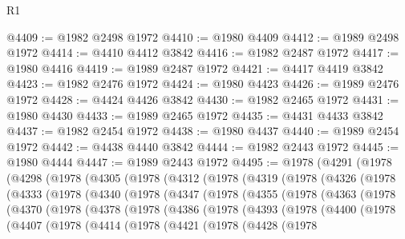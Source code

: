 \begin{lexlean}{R1}
\begin{coremodule}
@4409 := @1982 @2498 @1972
@4410 := @1980 @4409
@4412 := @1989 @2498 @1972
@4414 := @4410 @4412 @3842
@4416 := @1982 @2487 @1972
@4417 := @1980 @4416
@4419 := @1989 @2487 @1972
@4421 := @4417 @4419 @3842
@4423 := @1982 @2476 @1972
@4424 := @1980 @4423
@4426 := @1989 @2476 @1972
@4428 := @4424 @4426 @3842
@4430 := @1982 @2465 @1972
@4431 := @1980 @4430
@4433 := @1989 @2465 @1972
@4435 := @4431 @4433 @3842
@4437 := @1982 @2454 @1972
@4438 := @1980 @4437
@4440 := @1989 @2454 @1972
@4442 := @4438 @4440 @3842
@4444 := @1982 @2443 @1972
@4445 := @1980 @4444
@4447 := @1989 @2443 @1972
@4495 := @1978
    (@4291
      (@1978
        (@4298
          (@1978
            (@4305
              (@1978
                (@4312
                  (@1978
                    (@4319
                      (@1978
                        (@4326
                          (@1978
                            (@4333
                              (@1978
                                (@4340
                                  (@1978
                                    (@4347
                                      (@1978
                                        (@4355
                                          (@1978
                                            (@4363
                                              (@1978
                                                (@4370
                                                  (@1978
                                                    (@4378
                                                      (@1978
                                                        (@4386
                                                          (@1978
                                                            (@4393
                                                              (@1978
                                                                (@4400
                                                                  (@1978
                                                                    (@4407
                                                                      (@1978
                                                                        (@4414
                                                                          (@1978
                                                                            (@4421
                                                                              (@1978
                                                                                (@4428
                                                                                  (@1978

\end{coremodule}
\end{lexlean}
